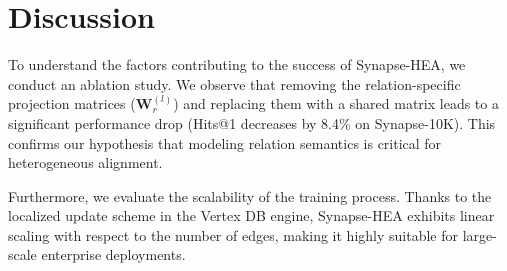 \section{Discussion}
To understand the factors contributing to the success of Synapse-HEA, we conduct an ablation study. We observe that removing the relation-specific projection matrices ($\mathbf{W}_r^{(l)}$) and replacing them with a shared matrix leads to a significant performance drop (Hits@1 decreases by 8.4\% on Synapse-10K). This confirms our hypothesis that modeling relation semantics is critical for heterogeneous alignment.

Furthermore, we evaluate the scalability of the training process. Thanks to the localized update scheme in the Vertex DB engine, Synapse-HEA exhibits linear scaling with respect to the number of edges, making it highly suitable for large-scale enterprise deployments.
